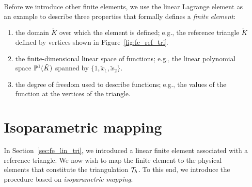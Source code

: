 Before we introduce other finite elements, we use the linear Lagrange element as an example to describe three properties that formally defines a \emph{finite element}:
\begin{enumerate}
\item the domain $\tilde K$ over which the element is defined; e.g., the reference triangle $\tilde K$ defined by vertices shown in Figure~\ref{fig:fe_ref_tri}.
\item the finite-dimensional linear space of functions; e.g., the linear polynomial space $\mathbb{P}^1(\tilde K)$ spanned by $\{ 1, \tilde x_1, \tilde x_2 \}$.
\item the degree of freedom used to describe functions; e.g., the values of the function at the vertices of the triangle.
\end{enumerate}

\section{Isoparametric mapping}
In Section~\ref{sec:fe_lin_tri}, we introduced a linear finite element associated with a reference triangle.  We now wish to map the finite element to the physical elements that constitute the triangulation $\mathcal{T}_h$.  To this end, we introduce the procedure based on \emph{isoparametric mapping}.

\begin{figure}
  \centering
\end{figure}

